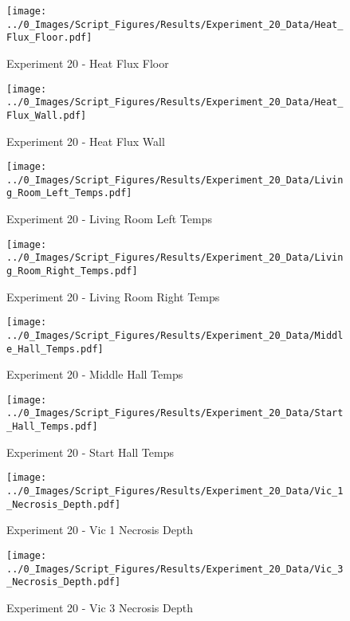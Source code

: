 	\begin{figure}[H]
		\centering
		\texttt{[image: ../0\_Images/Script\_Figures/Results/Experiment\_20\_Data/Heat\_Flux\_Floor.pdf]}
		\caption[]{Experiment 20 - Heat Flux Floor}
	\end{figure}
 
	\clearpage

	\begin{figure}[H]
		\centering
		\texttt{[image: ../0\_Images/Script\_Figures/Results/Experiment\_20\_Data/Heat\_Flux\_Wall.pdf]}
		\caption[]{Experiment 20 - Heat Flux Wall}
	\end{figure}
 

	\begin{figure}[H]
		\centering
		\texttt{[image: ../0\_Images/Script\_Figures/Results/Experiment\_20\_Data/Living\_Room\_Left\_Temps.pdf]}
		\caption[]{Experiment 20 - Living Room Left Temps}
	\end{figure}
 
	\clearpage

	\begin{figure}[H]
		\centering
		\texttt{[image: ../0\_Images/Script\_Figures/Results/Experiment\_20\_Data/Living\_Room\_Right\_Temps.pdf]}
		\caption[]{Experiment 20 - Living Room Right Temps}
	\end{figure}
 

	\begin{figure}[H]
		\centering
		\texttt{[image: ../0\_Images/Script\_Figures/Results/Experiment\_20\_Data/Middle\_Hall\_Temps.pdf]}
		\caption[]{Experiment 20 - Middle Hall Temps}
	\end{figure}
 
	\clearpage

	\begin{figure}[H]
		\centering
		\texttt{[image: ../0\_Images/Script\_Figures/Results/Experiment\_20\_Data/Start\_Hall\_Temps.pdf]}
		\caption[]{Experiment 20 - Start Hall Temps}
	\end{figure}
 

	\begin{figure}[H]
		\centering
		\texttt{[image: ../0\_Images/Script\_Figures/Results/Experiment\_20\_Data/Vic\_1\_Necrosis\_Depth.pdf]}
		\caption[]{Experiment 20 - Vic 1 Necrosis Depth}
	\end{figure}
 
	\clearpage

	\begin{figure}[H]
		\centering
		\texttt{[image: ../0\_Images/Script\_Figures/Results/Experiment\_20\_Data/Vic\_3\_Necrosis\_Depth.pdf]}
		\caption[]{Experiment 20 - Vic 3 Necrosis Depth}
	\end{figure}
 

